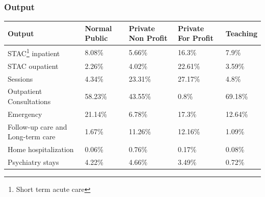 \documentclass[10pt,mathserif,aspectratio=169]{beamer}
\begin{document}
\begin{frame}
  \frametitle{Output}
  \begin{table} \fontsize{8pt}{10pt}\selectfont
    \begin{tabular}{lllll}
      \toprule
      Output                                         & Normal Public & Private Non Profit & Private For Profit & Teaching \\
      \midrule
      STAC\footnote{Short term acute care} inpatient & 8.08\%        & 5.66\%             & 16.3\%             & 7.9\%    \\
      STAC oupatient                                 & 2.26\%        & 4.02\%             & 22.61\%            & 3.59\%   \\
      Sessions                                       & 4.34\%        & 23.31\%            & 27.17\%            & 4.8\%    \\
      Outpatient Consultations                       & 58.23\%       & 43.55\%            & 0.8\%              & 69.18\%  \\
      Emergency                                      & 21.14\%       & 6.78\%             & 17.3\%             & 12.64\%  \\
      Follow-up care and Long-term care              & 1.67\%        & 11.26\%            & 12.16\%            & 1.09\%   \\
      Home hospitalization                           & 0.06\%        & 0.76\%             & 0.17\%             & 0.08\%   \\
      Psychiatry stays                               & 4.22\%        & 4.66\%             & 3.49\%             & 0.72\%   \\
      \bottomrule
    \end{tabular}
  \end{table}

\end{frame}
\end{document}
